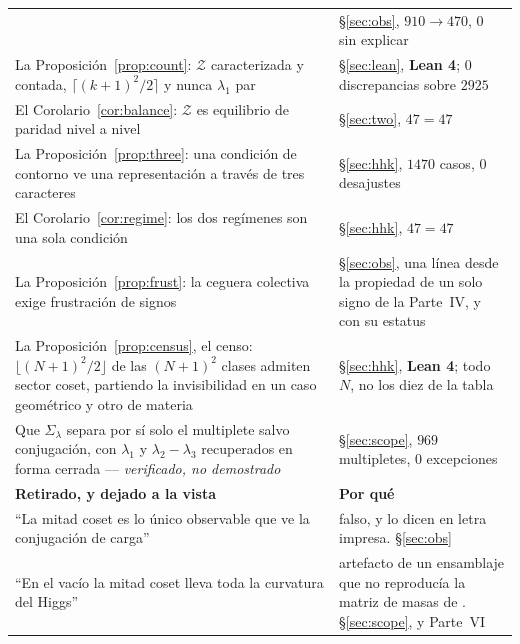 \documentclass[11pt,a4paper]{article}
\newcommand{\Sig}{\Sigma_\lambda}
\begin{document}
\begin{longtable}{p{7.1cm} p{8.1cm}}
& \S\ref{sec:obs}, $910\to470$, $0$ sin explicar\\
La Proposición~\ref{prop:count}: $\mathcal Z$ caracterizada y contada, $\lceil(k+1)^2/2\rceil$ y
nunca $\lambda_1$ par & \S\ref{sec:lean}, \textbf{\color{okgreen}Lean 4}; $0$ discrepancias sobre
$2925$\\
El Corolario~\ref{cor:balance}: $\mathcal Z$ es equilibrio de paridad nivel a nivel &
\S\ref{sec:two}, $47=47$\\
La Proposición~\ref{prop:three}: una condición de contorno ve una representación a través de tres
caracteres & \S\ref{sec:hhk}, $1470$ casos, $0$ desajustes\\
El Corolario~\ref{cor:regime}: los dos regímenes son una sola condición & \S\ref{sec:hhk}, $47=47$\\
La Proposición~\ref{prop:frust}: la ceguera colectiva exige frustración de signos & \S\ref{sec:obs},
una línea desde la propiedad de un solo signo de la Parte~IV, y con su estatus\\
La Proposición~\ref{prop:census}, el censo: $\lfloor(N+1)^2/2\rfloor$ de las $(N+1)^2$ clases admiten
sector coset, partiendo la invisibilidad en un caso geométrico y otro de materia &
\S\ref{sec:hhk}, \textbf{\color{okgreen}Lean 4}; todo $N$, no los diez de la tabla\\
Que $\Sig$ separa por sí solo el multiplete salvo conjugación, con $\lambda_1$ y
$\lambda_2-\lambda_3$ recuperados en forma cerrada --- \emph{verificado, no demostrado} &
\S\ref{sec:scope}, $969$ multipletes, $0$ excepciones\\
\midrule
\rowcolor{warmred!14}\textbf{Retirado, y dejado a la vista} & \textbf{Por qué}\\
\midrule
``La mitad coset es lo único observable que ve la conjugación de carga'' & falso, y \cite{KKKY} lo
dicen en letra impresa. \S\ref{sec:obs}\\
``En el vacío la mitad coset lleva toda la curvatura del Higgs'' & artefacto de un ensamblaje que no
reproducía la matriz de masas de \cite{AHMN}. \S\ref{sec:scope}, y Parte~VI\\
\bottomrule
\end{longtable}
\endgroup
\end{document}
